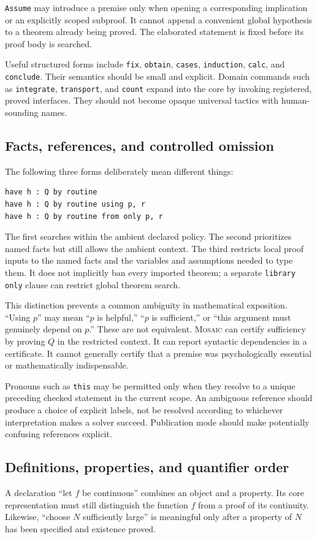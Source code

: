 \documentclass[11pt,a4paper]{article}
\newcommand{\code}[1]{\texttt{\small #1}}
\newcommand{\Mosaic}{\textsc{Mosaic}}
\theoremstyle{definition}
\theoremstyle{remark}
\begin{document}
\code{Assume} may introduce a premise only when opening a corresponding implication or an explicitly scoped subproof. It cannot append a convenient global hypothesis to a theorem already being proved. The elaborated statement is fixed before its proof body is searched.

Useful structured forms include \code{fix}, \code{obtain}, \code{cases}, \code{induction}, \code{calc}, and \code{conclude}. Their semantics should be small and explicit. Domain commands such as \code{integrate}, \code{transport}, and \code{count} expand into the core by invoking registered, proved interfaces. They should not become opaque universal tactics with human-sounding names.

\subsection{Facts, references, and controlled omission}
The following three forms deliberately mean different things:
\begin{lstlisting}
have h : Q by routine
have h : Q by routine using p, r
have h : Q by routine from only p, r
\end{lstlisting}
The first searches within the ambient declared policy. The second prioritizes named facts but still allows the ambient context. The third restricts local proof inputs to the named facts and the variables and assumptions needed to type them. It does not implicitly ban every imported theorem; a separate \code{library only} clause can restrict global theorem search.

This distinction prevents a common ambiguity in mathematical exposition. ``Using $p$'' may mean ``$p$ is helpful,'' ``$p$ is sufficient,'' or ``this argument must genuinely depend on $p$.'' These are not equivalent. \Mosaic{} can certify sufficiency by proving $Q$ in the restricted context. It can report syntactic dependencies in a certificate. It cannot generally certify that a premise was psychologically essential or mathematically indispensable.

Pronouns such as \code{this} may be permitted only when they resolve to a unique preceding checked statement in the current scope. An ambiguous reference should produce a choice of explicit labels, not be resolved according to whichever interpretation makes a solver succeed. Publication mode should make potentially confusing references explicit.

\subsection{Definitions, properties, and quantifier order}
A declaration ``let $f$ be continuous'' combines an object and a property. Its core representation must still distinguish the function $f$ from a proof of its continuity. Likewise, ``choose $N$ sufficiently large'' is meaningful only after a property of $N$ has been specified and existence proved.
\end{document}
